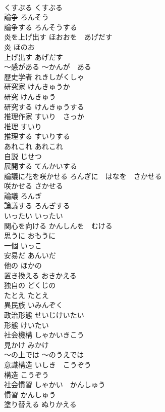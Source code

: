 \documentclass[8pt]{extreport}
\begin{document}
\begin{CJK}{UTF8}{min}
\\	くすぶる	くすぶる	
\\	論争	ろんそう	
\\	論争する	ろんそうする	
\\	炎を上げ出す	ほおおを　あげだす	
\\	炎	ほのお	
\\	上げ出す	あげだす	
\\	〜感がある	〜かんが　ある	
\\	歴史学者	れきしがくしゃ	
\\	研究家	けんきゅうか	
\\	研究	けんきゅう	
\\	研究する	けんきゅうする	
\\	推理作家	すいり　さっか	
\\	推理	すいり	
\\	推理する	すいりする	
\\	あれこれ	あれこれ	
\\	自説	じせつ	
\\	展開する	てんかいする	
\\	論議に花を咲かせる	ろんぎに　はなを　さかせる	
\\	咲かせる	さかせる	
\\	論議	ろんぎ	
\\	論議する	ろんぎする	
\\	いったい	いったい	
\\	関心を向ける	かんしんを　むける	
\\	思うに	おもうに	
\\	一個	いっこ	
\\	安易だ	あんいだ	
\\	他の	ほかの	
\\	置き換える	おきかえる	
\\	独自の	どくじの	
\\	たとえ	たとえ	
\\	異民族	いみんぞく	
\\	政治形態	せいじけいたい	
\\	形態	けいたい	
\\	社会機構	しゃかいきこう	
\\	見かけ	みかけ	
\\	〜の上では	〜のうえでは	
\\	意識構造	いしき　こうぞう	
\\	構造	こうぞう	
\\	社会慣習	しゃかい　かんしゅう	
\\	慣習	かんしゅう	
\\	塗り替える	ぬりかえる	

\end{CJK}
\end{document}
